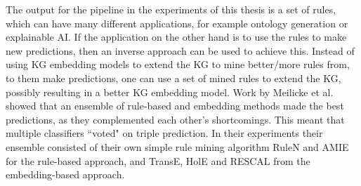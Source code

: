 The output for the pipeline in the experiments of this thesis is a set of rules, which can have many different applications, for example ontology generation or explainable AI. If the application on the other hand is to use the rules to make new predictions, then an inverse approach can be used to achieve this. Instead of using KG embedding models to extend the KG to mine better/more rules from, to them make predictions, one can use a set of mined rules to extend the KG, possibly resulting in a better KG embedding model. Work by Meilicke et al. \cite{ensemble} showed that an ensemble of rule-based and embedding methods made the best predictions, as they complemented each other's shortcomings. This meant that multiple classifiers ``voted" on triple prediction. In their experiments their ensemble consisted of their own simple rule mining algorithm RuleN and AMIE for the rule-based approach, and TransE, HolE and RESCAL from the embedding-based approach.